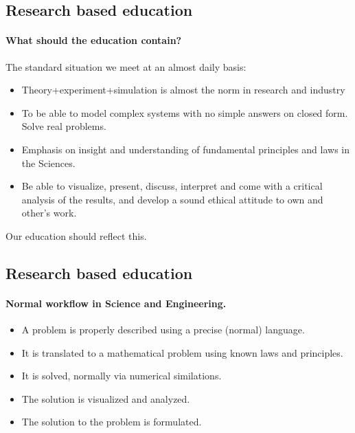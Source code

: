 \documentclass[%
twoside,                 %
final,                   %
10pt]{article}
\begin{document}
\subsection{Research based education}

\paragraph{What should the education contain?}
The standard situation we meet at an almost daily basis:

\begin{itemize}
\item Theory+experiment+simulation is almost the norm in research and industry

\item To be able to model complex systems with no simple answers on closed form. Solve real problems.

\item Emphasis on insight and understanding of fundamental principles and laws in the Sciences.

\item Be able to visualize, present, discuss, interpret and come with a critical analysis of the results, and develop a sound ethical attitude to own and other's work.
\end{itemize}

\noindent
Our education should reflect this.





\subsection{Research based education}

\paragraph{Normal workflow in Science and Engineering.}

\begin{itemize}
\item A problem is properly described using a precise (normal) language.

\item It is translated to a mathematical problem using known laws and  principles.

\item It is solved, normally via numerical similations.

\item The solution is visualized and analyzed.

\item The solution to the problem is formulated.
\end{itemize}
\end{document}
